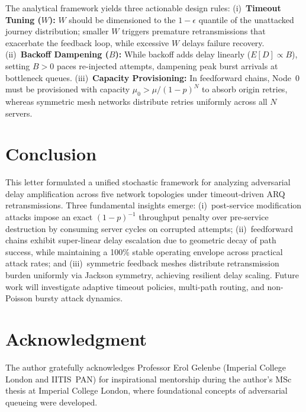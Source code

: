 \documentclass[journal,compsoc]{IEEEtran}
\begin{document}
The analytical framework yields three actionable design rules: (i)~\textbf{Timeout Tuning ($W$):} $W$ should be dimensioned to the $1 - \epsilon$ quantile of the unattacked journey distribution; smaller $W$ triggers premature retransmissions that exacerbate the feedback loop, while excessive $W$ delays failure recovery. (ii)~\textbf{Backoff Dampening ($B$):} While backoff adds delay linearly ($E[D] \propto B$), setting $B > 0$ paces re-injected attempts, dampening peak burst arrivals at bottleneck queues. (iii)~\textbf{Capacity Provisioning:} In feedforward chains, Node~0 must be provisioned with capacity $\mu_0 > \mu / (1-p)^N$ to absorb origin retries, whereas symmetric mesh networks distribute retries uniformly across all $N$ servers.

\section{Conclusion}
This letter formulated a unified stochastic framework for analyzing adversarial delay amplification across five network topologies under timeout-driven ARQ retransmissions. Three fundamental insights emerge: (i)~post-service modification attacks impose an exact $(1-p)^{-1}$ throughput penalty over pre-service destruction by consuming server cycles on corrupted attempts; (ii)~feedforward chains exhibit super-linear delay escalation due to geometric decay of path success, while maintaining a 100\% stable operating envelope across practical attack rates; and (iii)~symmetric feedback meshes distribute retransmission burden uniformly via Jackson symmetry, achieving resilient delay scaling. Future work will investigate adaptive timeout policies, multi-path routing, and non-Poisson bursty attack dynamics.

\section*{Acknowledgment}
The author gratefully acknowledges Professor Erol Gelenbe (Imperial College London and IITIS~PAN) for inspirational mentorship during the author's MSc thesis at Imperial College London, where foundational concepts of adversarial queueing were developed.
\end{document}
